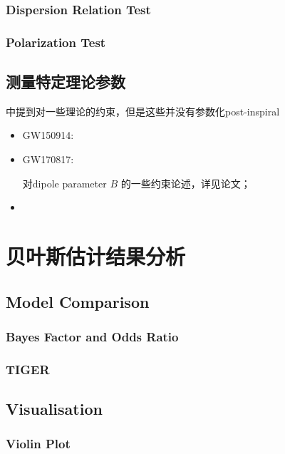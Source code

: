\documentclass[CJK]{paper}  %
\begin{document}
\subsubsection{Dispersion Relation Test}


\subsubsection{Polarization Test}


\subsection{测量特定理论参数}
\par \cite{test_GR_GW170817}中提到对一些理论的约束，但是这些并没有参数化post-inspiral


\begin{itemize}
	\item[1. ] GW150914\cite{test_GR_GW150914}: 
	\item[2. ] GW170817\cite{test_GR_GW170817}:
		\par 对dipole parameter $B$ 的一些约束论述，详见论文；
	\item[] 
\end{itemize}


\newpage
\section{贝叶斯估计结果分析}
\subsection{Model Comparison}
\subsubsection{Bayes Factor and Odds Ratio}

\subsubsection{TIGER}

\subsection{Visualisation}


\subsubsection{Violin Plot}
\end{document}
